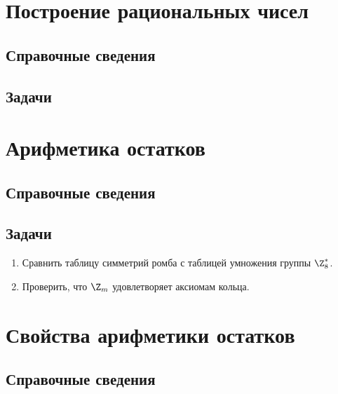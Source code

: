\section{Построение рациональных чисел}

\subsection*{Справочные сведения}

\subsection*{Задачи}

\label{ostatki}


\section{Арифметика остатков}

\subsection*{Справочные сведения}

\subsection*{Задачи}

\begin{enumerate}
\item Сравнить таблицу симметрий ромба с таблицей умножения группы $\Z_8^*$.
\item Проверить, что $\Z_m$ удовлетворяет аксиомам кольца.
\end{enumerate}

\section{Свойства арифметики остатков}

\subsection*{Справочные сведения}

